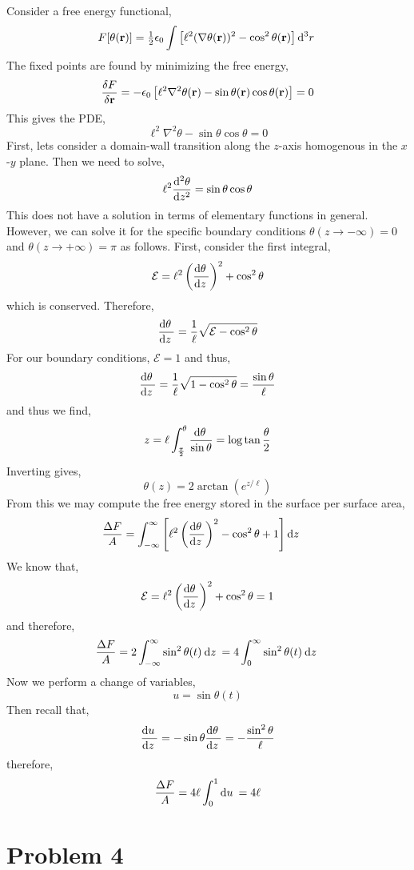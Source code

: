 \documentclass[12pt]{extarticle}
\begin{document}
Consider a free energy functional,
\[ F [ \theta(\bf{r}) ] = \tfrac{1}{2} \epsilon_0 \int \left[ \ell^2 (\nabla \theta(\bf{r}))^2 - \cos^2{\theta(\bf{r})} \right] \dn{3}{r} \]
The fixed points are found by minimizing the free energy,
\[ \frac{\delta F}{\delta \bf{r}} = - \epsilon_0 \left[ \ell^2  \nabla^2 \theta(\bf{r}) - \sin{\theta(\bf{r})} \cos{\theta(\bf{r})} \right] = 0 \]
This gives the PDE,
\[ \ell^2 \nabla^2 \theta - \sin{\theta} \cos{\theta} = 0 \]
First, lets consider a domain-wall transition along the $z$-axis homogenous in the $x$-$y$ plane. Then we need to solve,
\[ \ell^2 \nderiv{2}{\theta}{z} = \sin{\theta} \cos{\theta} \]
This does not have a solution in terms of elementary functions in general. However, we can solve it for the specific boundary conditions $\theta(z \to -\infty) = 0$ and $\theta(z \to + \infty) = \pi$ as follows. First, consider the first integral,
\[ \mathcal{E} = \ell^2 \left(\deriv{\theta}{z}\right)^2 + \cos^2{\theta} \]
which is conserved. Therefore,
\[ \deriv{\theta}{z} = \frac{1}{\ell} \sqrt{\mathcal{E} - \cos^2{\theta}} \]
For our boundary conditions, $\mathcal{E} = 1$ and thus,
\[ \deriv{\theta}{z} = \frac{1}{\ell} \sqrt{1 - \cos^2{\theta}} = \frac{\sin{\theta}}{\ell} \]
and thus we find,
\[ z = \ell \int_{\frac{\pi}{2}}^{\theta} \frac{\d{\theta}}{\sin{\theta}} =  \log{\tan{\frac{\theta}{2}}}   \] 
Inverting gives,
\[ \theta(z) = 2 \arctan{(e^{z / \ell})} \]
From this we may compute the free energy stored in the surface per surface area,
\begin{align*}
\frac{\Delta F}{A} & = \int_{-\infty}^{\infty} \left[ \ell^2 \left( \deriv{\theta}{z} \right)^2 - \cos^2{\theta} + 1 \right] \d{z}
\end{align*}
We know that,
\[ \mathcal{E} = \ell^2 \left( \deriv{\theta}{z} \right)^2 + \cos^2{\theta} = 1 \]
and therefore,
\[ \frac{\Delta F}{A} = 2 \int_{-\infty}^{\infty} \sin^2{\theta(t)} \: \d{z} = 4 \int_{0}^{\infty} \sin^2{\theta(t)} \: \d{z} \]
Now we perform a change of variables,
\[ u = \sin{\theta(t)} \]
Then recall that,
\[ \deriv{u}{z} = - \sin{\theta} \deriv{\theta}{z} = - \frac{\sin^2{\theta}}{\ell} \]
therefore,
\[ \frac{\Delta F}{A} = 4 \ell \int_0^{1} \d{u} = 4 \ell \]

\section{Problem 4}
\end{document}
